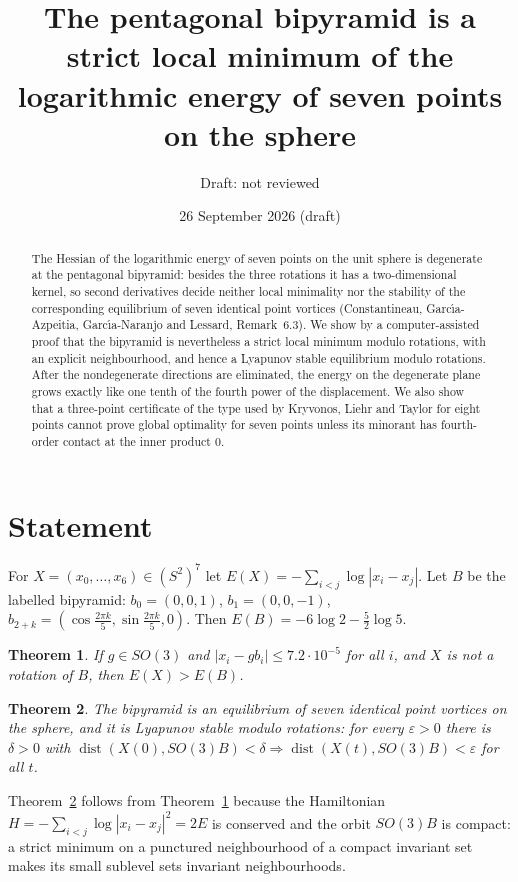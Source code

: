 \documentclass[11pt]{amsart}
\title[The pentagonal bipyramid is a strict local minimum]{The pentagonal bipyramid is a strict local minimum of the logarithmic energy of seven points on the sphere}
\author{Draft: not reviewed}
\date{26 September 2026 (draft)}
\newtheorem{theorem}{Theorem}
\theoremstyle{remark}
\begin{document}
\begin{abstract}
The Hessian of the logarithmic energy of seven points on the unit sphere is degenerate at the
pentagonal bipyramid: besides the three rotations it has a two-dimensional kernel, so second
derivatives decide neither local minimality nor the stability of the corresponding equilibrium of
seven identical point vortices (Constantineau, Garc\'{\i}a-Azpeitia, Garc\'{\i}a-Naranjo and Lessard,
Remark~6.3). We show by a computer-assisted proof that the bipyramid is nevertheless a strict local
minimum modulo rotations, with an explicit neighbourhood, and hence a Lyapunov stable equilibrium
modulo rotations. After the nondegenerate directions are eliminated, the energy on the degenerate plane
grows exactly like one tenth of the fourth power of the displacement. We also show that a
three-point certificate of the type used by Kryvonos, Liehr and Taylor for eight points cannot prove
global optimality for seven points unless its minorant has fourth-order contact at the inner product $0$.
\end{abstract}
\maketitle

\section{Statement}
For $X=(x_0,\dots,x_6)\in(S^2)^7$ let $E(X)=-\sum_{i<j}\log|x_i-x_j|$. Let $B$ be the labelled
bipyramid: $b_0=(0,0,1)$, $b_1=(0,0,-1)$, $b_{2+k}=(\cos\frac{2\pi k}{5},\sin\frac{2\pi k}{5},0)$. Then
$E(B)=-6\log 2-\frac52\log 5$.

\begin{theorem}\label{thm:local}
If $g\in SO(3)$ and $|x_i-g b_i|\le 7.2\cdot 10^{-5}$ for all $i$, and $X$ is not a rotation of $B$, then $E(X)>E(B)$.
\end{theorem}

\begin{theorem}\label{thm:stab}
The bipyramid is an equilibrium of seven identical point vortices on the sphere, and it is Lyapunov
stable modulo rotations: for every $\varepsilon>0$ there is $\delta>0$ with
$\operatorname{dist}(X(0),SO(3)B)<\delta\Rightarrow\operatorname{dist}(X(t),SO(3)B)<\varepsilon$ for all $t$.
\end{theorem}

Theorem~\ref{thm:stab} follows from Theorem~\ref{thm:local} because the Hamiltonian
$H=-\sum_{i<j}\log|x_i-x_j|^2=2E$ is conserved and the orbit $SO(3)B$ is compact: a strict minimum on a
punctured neighbourhood of a compact invariant set makes its small sublevel sets invariant neighbourhoods.
\end{document}

